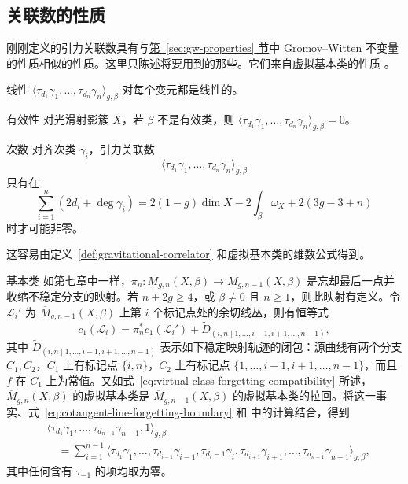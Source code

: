 \subsection{关联数的性质}\label{subsec:gravitational-correlator-properties}
刚刚定义的引力关联数具有与\hyperref[sec:gw-properties]{第~\ref*{sec:gw-properties} 节}中 Gromov--Witten 不变量的性质相似的性质。这里只陈述将要用到的那些。它们来自虚拟基本类的性质 。
\begin{axiom*}{线性}
$\langle\tau_{d_1}\gamma_1,\ldots,\tau_{d_n}\gamma_n\rangle_{g,\beta}$ 对每个变元都是线性的。
\end{axiom*}

\begin{axiom*}{有效性}
对光滑射影簇 $X$，若 $\beta$ 不是有效类，则 $\langle\tau_{d_1}\gamma_1,\ldots,\tau_{d_n}\gamma_n\rangle_{g,\beta}=0$。
\end{axiom*}

\begin{axiom*}{次数}
对齐次类 $\gamma_i$，引力关联数
\[
\langle\tau_{d_1}\gamma_1,\ldots,\tau_{d_n}\gamma_n\rangle_{g,\beta}
\]
只有在
\[
\sum_{i=1}^n(2d_i+\deg\gamma_i)
=2(1-g)\dim X-2\int_\beta\omega_X+2(3g-3+n)
\]
时才可能非零。
\end{axiom*}
这容易由定义~\ref{def:gravitational-correlator} 和虚拟基本类的维数公式得到。

\begin{axiom*}{基本类}
如\hyperref[chap:gromov-witten]{第七章}中一样，$\pi_n:\overline M_{g,n}(X,\beta)\to\overline M_{g,n-1}(X,\beta)$ 是忘却最后一点并收缩不稳定分支的映射。若 $n+2g\ge4$，或 $\beta\ne0$ 且 $n\ge1$，则此映射有定义。令 $\mathcal L_i'$ 为 $\overline M_{g,n-1}(X,\beta)$ 上第 $i$ 个标记点处的余切线丛，则有恒等式
\begin{equation}\label{eq:cotangent-line-forgetting-boundary}
c_1(\mathcal L_i)=\pi_n^*c_1(\mathcal L_i')
+\widetilde D_{(i,n\mid1,\ldots,i-1,i+1,\ldots,n-1)},
\end{equation}
其中 $\widetilde D_{(i,n\mid1,\ldots,i-1,i+1,\ldots,n-1)}$ 表示如下稳定映射轨迹的闭包：源曲线有两个分支 $C_1,C_2$，$C_1$ 上有标记点 $\{i,n\}$，$C_2$ 上有标记点 $\{1,\ldots,i-1,i+1,\ldots,n-1\}$，而且 $f$ 在 $C_1$ 上为常值。又如式~\eqref{eq:virtual-class-forgetting-compatibility} 所述，$\overline M_{g,n}(X,\beta)$ 的虚拟基本类是 $\overline M_{g,n-1}(X,\beta)$ 的虚拟基本类的拉回。将这一事实、式~\eqref{eq:cotangent-line-forgetting-boundary} 和  中的计算结合，得到
\[
\begin{aligned}
&\langle\tau_{d_1}\gamma_1,\ldots,\tau_{d_{n-1}}\gamma_{n-1},1\rangle_{g,\beta}\\
&\quad=\sum_{i=1}^{n-1}\langle\tau_{d_1}\gamma_1,\ldots,
\tau_{d_{i-1}}\gamma_{i-1},\tau_{d_i-1}\gamma_i,
\tau_{d_{i+1}}\gamma_{i+1},\ldots,\tau_{d_{n-1}}\gamma_{n-1}\rangle_{g,\beta},
\end{aligned}
\]
其中任何含有 $\tau_{-1}$ 的项均取为零。
\end{axiom*}

